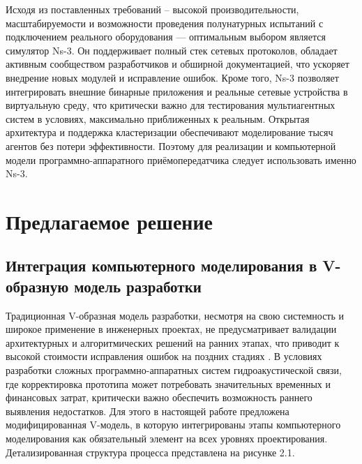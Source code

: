 \documentclass[
    numbers=section,
    document-code={ВКРБ--09.03.04--10.19--XX--26--81}
]{../latex/fqw}
\begin{document}
    Исходя из поставленных требований -- высокой производительности,
    масштабируемости и возможности проведения полунатурных испытаний с подключением реального оборудования ---
    оптимальным выбором является симулятор Ns-3.
    Он поддерживает полный стек сетевых протоколов,
    обладает активным сообществом разработчиков и обширной документацией,
    что ускоряет внедрение новых модулей и исправление ошибок.
    Кроме того, Ns-3 позволяет интегрировать внешние бинарные приложения и
    реальные сетевые устройства в виртуальную среду,
    что критически важно для тестирования мультиагентных систем в условиях, максимально приближенных к реальным.
    Открытая архитектура и поддержка кластеризации обеспечивают моделирование тысяч агентов без потери эффективности.
    Поэтому для реализации и компьютерной модели программно-аппаратного приёмопередатчика
    следует использовать именно Ns-3.


    \section{Предлагаемое решение}\label{sec:suggested_solution}

    \subsection{Интеграция компьютерного моделирования в V-образную модель разработки}
    \label{subsec:integrating_computer_simulation_into_v_shaped_development_model}
    \vspace{\baselineskip}

    Традиционная V-образная модель разработки, несмотря на свою системность и широкое применение в инженерных проектах,
    не предусматривает валидации архитектурных и алгоритмических решений на ранних этапах,
    что приводит к высокой стоимости исправления ошибок на поздних стадиях\nbspace
    \cite[гл.3]{makkonnellSovershennyyKodMasterklass2024}.
    В условиях разработки сложных программно-аппаратных систем гидроакустической связи,
    где корректировка прототипа может потребовать значительных временных и финансовых затрат,
    критически важно обеспечить возможность раннего выявления недостатков.
    Для этого в настоящей работе предложена модифицированная V-модель,
    в которую интегрированы этапы компьютерного моделирования как обязательный элемент на всех уровнях проектирования.
    Детализированная структура процесса представлена на рисунке 2.1.
\end{document}
